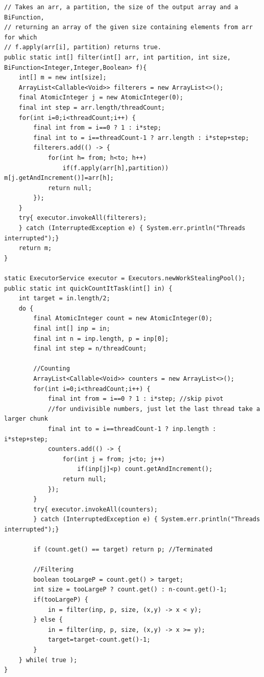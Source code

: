 \documentclass[a5paper]{article}
\begin{document}
\begin{lstlisting}
// Takes an arr, a partition, the size of the output array and a BiFunction,
// returning an array of the given size containing elements from arr for which 
// f.apply(arr[i], partition) returns true.
public static int[] filter(int[] arr, int partition, int size,  BiFunction<Integer,Integer,Boolean> f){
    int[] m = new int[size];
    ArrayList<Callable<Void>> filterers = new ArrayList<>();
    final AtomicInteger j = new AtomicInteger(0);
    final int step = arr.length/threadCount;
    for(int i=0;i<threadCount;i++) {
        final int from = i==0 ? 1 : i*step;
        final int to = i==threadCount-1 ? arr.length : i*step+step;
        filterers.add(() -> {
            for(int h= from; h<to; h++)
                if(f.apply(arr[h],partition)) m[j.getAndIncrement()]=arr[h];
            return null;
        });
    }
    try{ executor.invokeAll(filterers);
    } catch (InterruptedException e) { System.err.println("Threads interrupted");}
    return m;
}

static ExecutorService executor = Executors.newWorkStealingPool();
public static int quickCountItTask(int[] in) {
    int target = in.length/2;
    do {
        final AtomicInteger count = new AtomicInteger(0);
        final int[] inp = in;
        final int n = inp.length, p = inp[0];
        final int step = n/threadCount;

        //Counting
        ArrayList<Callable<Void>> counters = new ArrayList<>();
        for(int i=0;i<threadCount;i++) {
            final int from = i==0 ? 1 : i*step; //skip pivot
            //for undivisible numbers, just let the last thread take a larger chunk
            final int to = i==threadCount-1 ? inp.length : i*step+step;
            counters.add(() -> {
                for(int j = from; j<to; j++)
                    if(inp[j]<p) count.getAndIncrement(); 
                return null;
            });
        }
        try{ executor.invokeAll(counters);
        } catch (InterruptedException e) { System.err.println("Threads interrupted");}

        if (count.get() == target) return p; //Terminated

        //Filtering
        boolean tooLargeP = count.get() > target;
        int size = tooLargeP ? count.get() : n-count.get()-1;
        if(tooLargeP) {
            in = filter(inp, p, size, (x,y) -> x < y);
        } else {
            in = filter(inp, p, size, (x,y) -> x >= y);
            target=target-count.get()-1;
        }
    } while( true );
}
\end{lstlisting}
\end{document}
